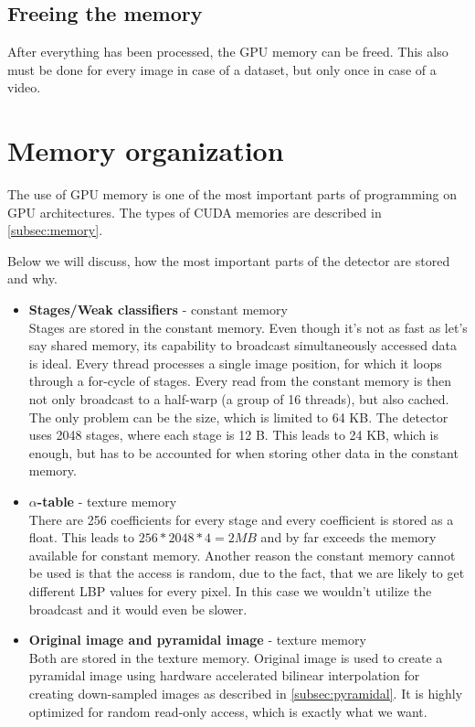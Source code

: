 \subsection{Freeing the memory}

After everything has been processed, the GPU memory can be freed. This also must be done for every image in case of a dataset, but only once in case of a video.

\section{Memory organization} \label{sec:memory-organization}

The use of GPU memory is one of the most important parts of programming on GPU architectures. The types of CUDA memories are described in \ref{subsec:memory}.

Below we will discuss, how the most important parts of the detector are stored and why.

\begin{itemize}
\item \textbf{Stages/Weak classifiers} - constant memory \\
Stages are stored in the constant memory. Even though it's not as fast as let's say shared memory, its capability to broadcast simultaneously accessed data is ideal. Every thread processes a single image position, for which it loops through a for-cycle of stages. Every read from the constant memory is then not only broadcast to a half-warp (a group of 16 threads), but also cached. The only problem can be the size, which is limited to 64 KB. The detector uses 2048 stages, where each stage is 12 B. This leads to 24 KB, which is enough, but has to be accounted for when storing other data in the constant memory.

\item \textbf{$\alpha$-table} - texture memory \\
There are 256 coefficients for every stage and every coefficient is stored as a float. This leads to $256 * 2048 * 4 = 2 MB$ and by far exceeds the memory available for constant memory. Another reason the constant memory cannot be used is that the access is random, due to the fact, that we are likely to get different LBP values for every pixel. In this case we wouldn't utilize the broadcast and it would even be slower.

\item \textbf{Original image and pyramidal image} - texture memory \\
Both are stored in the texture memory. Original image is used to create a pyramidal image using hardware accelerated bilinear interpolation for creating down-sampled images as described in \ref{subsec:pyramidal}. It is highly optimized for random read-only access, which is exactly what we want.
\end{itemize}

